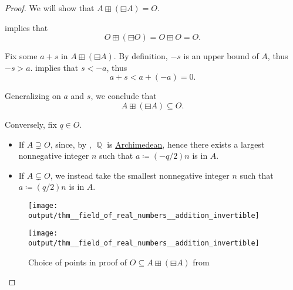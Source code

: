 \begin{proof}
   We will show that \( A \boxplus (\boxminus A) = O \).

    implies that
  \begin{equation*}
    O \boxplus (\boxminus O) = O \boxplus O = O.
  \end{equation*}

   Fix some \( a + s \) in \( A \boxplus (\boxminus A) \). By definition, \( -s \) is an upper bound of \( A \), thus \( -s > a \).  implies that \( s < -a \), thus
  \begin{equation*}
    a + s < a + (-a) = 0.
  \end{equation*}

  Generalizing on \( a \) and \( s \), we conclude that
  \begin{equation*}
    A \boxplus (\boxminus A) \subseteq O.
  \end{equation*}

  Conversely, fix \( q \in O \).

  \begin{itemize}
    \item If \( A \supsetneq O \), since, by , \( \BbbQ \) is \hyperref[def:archimedean_field]{Archimedean}, hence there exists a largest nonnegative integer \( n \) such that \( a \coloneqq (-q/2)n \) is in \( A \).

    \item If \( A \subsetneq O \), we instead take the smallest nonnegative integer \( n \) such that \( a \coloneqq (q/2)n \) is in \( A \).
  \end{itemize}

  \begin{figure}[!ht]
    \begin{subcaptionblock}{\textwidth}
      \centering
      \texttt{[image: output/thm\_\_field\_of\_real\_numbers\_\_addition\_invertible]}
    \end{subcaptionblock}

    \begin{subcaptionblock}{\textwidth}
      \centering
      \texttt{[image: output/thm\_\_field\_of\_real\_numbers\_\_addition\_invertible]}
    \end{subcaptionblock}

    \caption{Choice of points in proof of \( O \subseteq A \boxplus (\boxminus A) \) from }
    \label{fig:thm:field_of_real_numbers/addition_invertible}
  \end{figure}


\end{proof}
